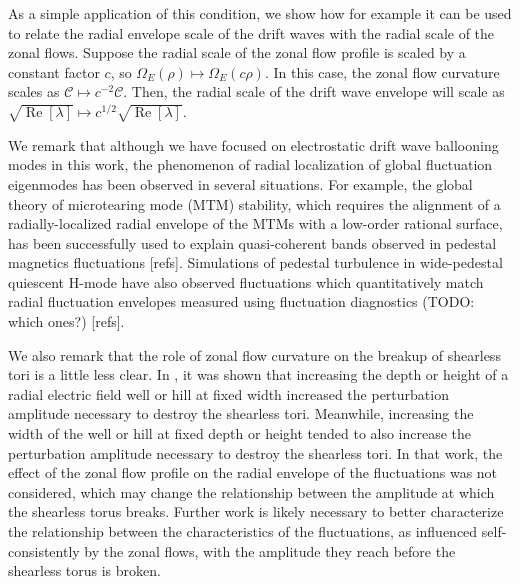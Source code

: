 \documentclass[]{article}
\begin{document}
As a simple application of this condition, we show how for example it can be used to relate the radial envelope scale of the drift waves with the radial scale of the zonal flows.
Suppose the radial scale of the zonal flow profile is scaled by a constant factor \(c\), so \(\Omega_E(\rho) \mapsto \Omega_E(c\rho)\).
In this case, the zonal flow curvature scales as \(\mathcal{C} \mapsto c^{-2} \mathcal{C}\).
Then, the radial scale of the drift wave envelope will scale as \(\sqrt{\operatorname{Re}[\lambda]} \mapsto c^{1/2} \sqrt{\operatorname{Re}[\lambda]}\).

We remark that although we have focused on electrostatic drift wave ballooning modes in this work, the phenomenon of radial localization of global fluctuation eigenmodes has been observed in several situations.
For example, the global theory of microtearing mode (MTM) stability, which requires the alignment of a radially-localized radial envelope of the MTMs with a low-order rational surface, has been successfully used to explain quasi-coherent bands observed in pedestal magnetics fluctuations [refs].
Simulations of pedestal turbulence in wide-pedestal quiescent H-mode have also observed fluctuations which quantitatively match radial fluctuation envelopes measured using fluctuation diagnostics (TODO: which ones?) [refs].

We also remark that the role of zonal flow curvature on the breakup of shearless tori is a little less clear.
In \citet{osorio-quiroga_shaping_2023}, it was shown that increasing the depth or height of a radial electric field well or hill at fixed width increased the perturbation amplitude necessary to destroy the shearless tori.
Meanwhile, increasing the width of the well or hill at fixed depth or height tended to also increase the perturbation amplitude necessary to destroy the shearless tori.
In that work, the effect of the zonal flow profile on the radial envelope of the fluctuations was not considered, which may change the relationship between the amplitude at which the shearless torus breaks.
Further work is likely necessary to better characterize the relationship between the characteristics of the fluctuations, as influenced self-consistently by the zonal flows, with the amplitude they reach before the shearless torus is broken.
\end{document}
